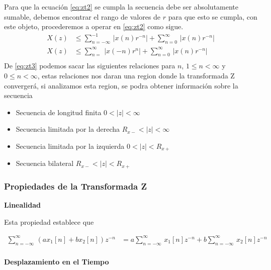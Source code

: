 \documentclass[12pt]{article}
\begin{document}
Para que la ecuación \ref{eq:zt2} se cumpla la secuencia debe ser absolutamente sumable, debemos encontrar el rango de valores de $r$ para que esto se cumpla, con este objeto, procederemos a operar en \ref{eq:zt2} como sigue.
\begin{equation}
    \begin{split}
        X(z)&\leq\displaystyle\sum_{n=-\infty}^{-1}\,|x(n)r^{-n}|+\displaystyle\sum_{n=0}^\infty\,|x(n)r^{-n}|\\
        X(z)&\leq\displaystyle\sum_{n=}^\infty\,|x(-n)r^{n}|+\displaystyle\sum_{n=0}^\infty\,|x(n)r^{-n}|\\
    \end{split}
    \label{eq:zt3}
\end{equation}
De \ref{eq:zt3} podemos sacar las siguientes relaciones para $n$, $1\leq n<\infty$ y $0\leq n<\infty$, estas relaciones nos daran una region donde la transformada Z convergerá, si analizamos esta region, se podra obtener información sobre la secuencia
\begin{itemize}
    \item Secuencia de longitud finita $0<|z|<\infty$
    \item Secuencia limitada por la derecha $R_{x-}<|z|<\infty$
    \item Secuencia limitada por la izquierda $0<|z|<R_{x+}$
    \item Secuencia bilateral $R_{x-}<|z|<R_{x+}$     
\end{itemize}
\subsubsection{Propiedades de la Transformada Z}
\textbf{Linealidad}
\vspace{5mm}

Esta propiedad establece que\par

\begin{equation}
    \begin{split}
        \displaystyle\sum_{n=-\infty}^{\infty}\,(ax_{1}[n]+bx_{2}[n])z^{-n}&=a\displaystyle\sum_{n=-\infty}^{\infty}\,x_{1}[n]z^{-n}+b\displaystyle\sum_{n=-\infty}^{\infty}\,x_{2}[n]z^{-n}\\
    \end{split}
    \label{eq:lineal}
\end{equation}

\textbf{Desplazamiento en el Tiempo}
\vspace{5mm}
\end{document}
